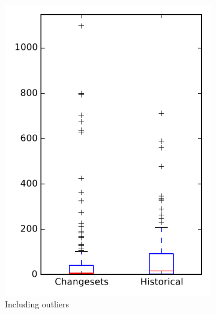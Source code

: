 
\begin{figure}
    \centering
    \begin{subfigure}{.4\textwidth}
        \centering
        \includegraphics[height=0.4\textheight]{figures/flt/rq2_pig}
        \caption{Including outliers}\label{fig:flt:rq2:pig_outlier}
    \end{subfigure}%
    \begin{subfigure}{.4\textwidth}
        \centering

\end{subfigure}
\end{figure}
